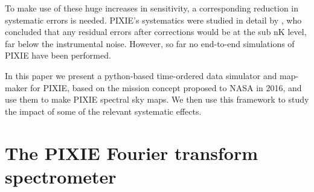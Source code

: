 \documentclass{article}
\begin{document}
To make use of these huge increases in sensitivity, a corresponding reduction in
systematic errors is needed. PIXIE's systematics were studied in detail by
\citet{pixie-systematics}, who concluded that any residual errors after corrections
would be at the sub nK level, far below the instrumental noise. However, so far
no end-to-end simulations of PIXIE have been performed.

In this paper we present a python-based time-ordered data simulator and
map-maker for PIXIE, based on the mission concept proposed to NASA in 2016, and
use them to make PIXIE spectral sky maps. We then use this framework to study
the impact of some of the relevant systematic effects.

\section{The PIXIE Fourier transform spectrometer}
\end{document}
